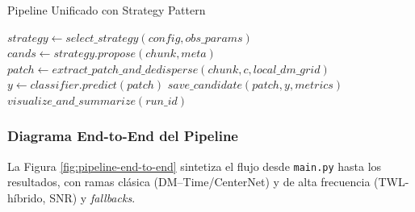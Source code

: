 \begin{algorithm}[H]
\caption{Pipeline Unificado con Strategy Pattern}
\begin{algorithmic}[1]
    \State $strategy \leftarrow select\_strategy(config, obs\_params)$
        \State $cands \leftarrow strategy.propose(chunk, meta)$
            \State $patch \leftarrow extract\_patch\_and\_dedisperse(chunk, c, local\_dm\_grid)$
            \State $y \leftarrow classifier.predict(patch)$
                \State $save\_candidate(patch, y, metrics)$
            \EndIf
        \EndFor
    \EndFor
    \State $visualize\_and\_summarize(run\_id)$
\EndFunction
\end{algorithmic}
\end{algorithm}

\subsubsection{Diagrama End-to-End del Pipeline}

La Figura \ref{fig:pipeline-end-to-end} sintetiza el flujo desde \texttt{main.py} hasta los resultados, con ramas clásica (DM--Time/CenterNet) y de alta frecuencia (TWL-híbrido, SNR) y \textit{fallbacks}.

